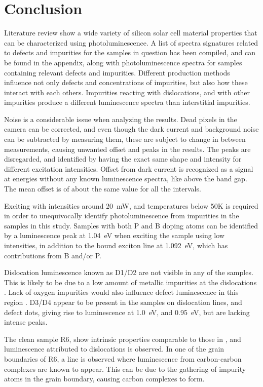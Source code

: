 \section{Conclusion}

Literature review show a wide variety of silicon solar cell material properties that can be characterized using photoluminescence. A list of spectra signatures related to defects and impurities for the samples in question has been compiled, and can be found in the appendix, along with photoluminescence spectra for samples containing relevant defects and impurities. Different production methods influence not only defects and concentrations of impurities, but also how these interact with each others. Impurities reacting with dislocations, and with other impurities produce a different luminescence spectra than interstitial impurities.


Noise is a considerable issue when analyzing the results. Dead pixels in the camera can be corrected, and even though the dark current and background noise can be subtracted by measuring them, these are subject to change in between measurements, causing unwanted offset and peaks in the results. The peaks are disregarded, and identified by having the exact same shape and intensity for different excitation intensities. Offset from dark current is recognized as a signal at energies without any known luminescence spectra, like above the band gap. The mean offset is of about the same value for all the intervals.

Exciting with intensities around 20~mW, and temperatures below 50K is required in order to unequivocally identify photoluminescence from impurities in the samples in this study. Samples with both P and B doping atoms can be identified by a luminescence peak at 1.04~eV when exciting the sample using low intensities, in addition to the bound exciton line at 1.092~eV, which has contributions from B and/or P. 


Dislocation luminescence known as D1/D2 are not visible in any of the samples. This is likely to be due to a low amount of metallic impurities at the 
dislocations \cite{arguirov07}. Lack of oxygen impurities would also influence defect luminescence in this region \cite{inoue07}. D3/D4 appear to be present in the samples on dislocation lines, and defect dots, giving rise to luminescence at 1.0~eV, and 0.95~eV, but are lacking intense peaks.

The clean sample R6, show intrinsic properties comparable to those in \cite{dean67}, and luminescence attributed to dislocations is observed. In one of the grain boundaries of R6, a line is observed where luminescence from carbon-carbon complexes are known to appear. This can be due to the gathering of impurity atoms in the grain boundary, causing carbon complexes to form.


